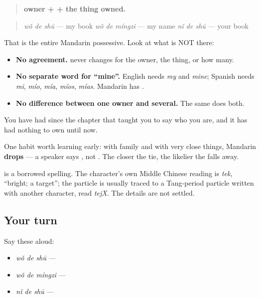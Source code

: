 \begin{grammarlens}[title={Grammar Lens: owner + \zh{的} + owned}]
\begin{quote}
\textbf{owner +  + the thing owned.}
\end{quote}

\begin{quote}
\textbf{} \emph{wǒ de shū} — my book \textbf{} \emph{wǒ de míngzi} — my name \textbf{} \emph{nǐ de shū} — your book
\end{quote}

That is the entire Mandarin possessive. Look at what is NOT there:

\begin{itemize}
\raggedright
  \item \textbf{No agreement.}  never changes for the owner, the thing, or how many.
  \item \textbf{No separate word for \textquotedblleft{}mine\textquotedblright{}.} English needs \emph{my} and \emph{mine}; Spanish needs \emph{mi}, \emph{mío}, \emph{mía}, \emph{míos}, \emph{mías}. Mandarin has .
  \item \textbf{No difference between one owner and several.} The same  does both.
\end{itemize}

You have had  since the chapter that taught you to say who you are, and it has had nothing to own until now.

One habit worth learning early: with family and with very close things, Mandarin \textbf{drops}  — a speaker says , not . The closer the tie, the likelier the  falls away.
\end{grammarlens}

\begin{cousinweb}
\textbf{} is a borrowed spelling. The character's own Middle Chinese reading is \emph{tek}, \textquotedblleft{}bright; a target\textquotedblright{}; the particle is usually traced to a Tang-period particle written with another character, read \emph{tejX}. The details are not settled.
\end{cousinweb}

\subsection*{Your turn}
Say these aloud:

\begin{itemize}
\raggedright
  \item \emph{wǒ de shū} — 
  \item \emph{wǒ de míngzi} — 
  \item \emph{nǐ de shū} — 
\end{itemize}

